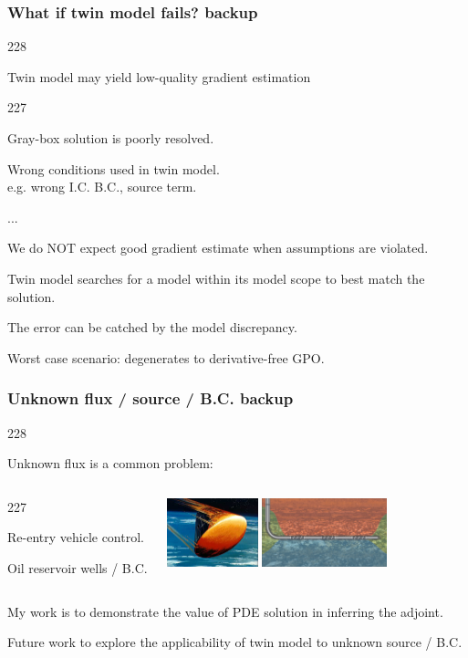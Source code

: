 \documentclass{beamer}
\newcommand{\barrow}{\item[\color{darkred}\ding{228}]}
\newcommand{\carrow}{\item[\color{darkred}\ding{227}]}
\begin{document}
\begin{frame}
    \frametitle{What if twin model fails? \hfill \scriptsize{backup}}\small
    \begin{dinglist}{228}
        \barrow Twin model may yield low-quality gradient estimation
        \vspace{.2cm}
        \begin{dinglist}{227}
            \barrow Gray-box solution is poorly resolved.
            \vspace{.15cm}
            \barrow Wrong conditions used in twin model.\\ e.g. wrong I.C. B.C., source term.
            \barrow ...
        \end{dinglist}
        \barrow We do NOT expect good gradient estimate when assumptions are violated.
        \vspace{.2cm}
        \barrow Twin model searches for a model within its model scope to best match the solution.
        \vspace{.2cm}
        \barrow The error can be catched by the model discrepancy.
        \vspace{.2cm}
        \barrow Worst case scenario: degenerates to derivative-free GPO.
    \end{dinglist}
\end{frame}

\begin{frame}
    \frametitle{Unknown flux / source / B.C. \hfill \scriptsize{backup}}\small
    \begin{dinglist}{228}
        \barrow Unknown flux is a common problem:
        \begin{columns}
            \begin{dinglist}{227}
                \carrow Re-entry vehicle control.
                \carrow Oil reservoir wells / B.C.
            \end{dinglist}
            \begin{center}
                \includegraphics[width=3.cm,height=2cm]{reentry.png}
                \includegraphics[width=3.cm,height=2cm]{icd.png}
            \end{center}
        \end{columns}
        \vspace{.2cm}
        \barrow My work is to demonstrate the value of PDE solution in inferring the adjoint.
        \vspace{.2cm}
        \barrow Future work to explore the applicability of twin model to unknown source / B.C.
    \end{dinglist}
\end{frame}
\end{document}
